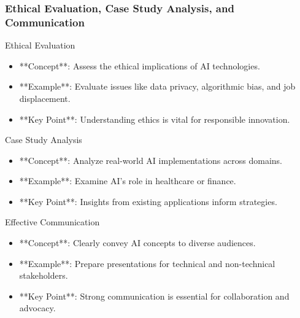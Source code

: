 \documentclass[aspectratio=169]{beamer}
\begin{document}
\begin{frame}[fragile]
    \frametitle{Ethical Evaluation, Case Study Analysis, and Communication}
    \begin{block}{Ethical Evaluation}
        \begin{itemize}
            \item **Concept**: Assess the ethical implications of AI technologies.
            \item **Example**: Evaluate issues like data privacy, algorithmic bias, and job displacement.
            \item **Key Point**: Understanding ethics is vital for responsible innovation.
        \end{itemize}
    \end{block}
    
    \begin{block}{Case Study Analysis}
        \begin{itemize}
            \item **Concept**: Analyze real-world AI implementations across domains.
            \item **Example**: Examine AI’s role in healthcare or finance.
            \item **Key Point**: Insights from existing applications inform strategies.
        \end{itemize}
    \end{block}

    \begin{block}{Effective Communication}
        \begin{itemize}
            \item **Concept**: Clearly convey AI concepts to diverse audiences.
            \item **Example**: Prepare presentations for technical and non-technical stakeholders.
            \item **Key Point**: Strong communication is essential for collaboration and advocacy.
        \end{itemize}
    \end{block}
\end{frame}
\end{document}
